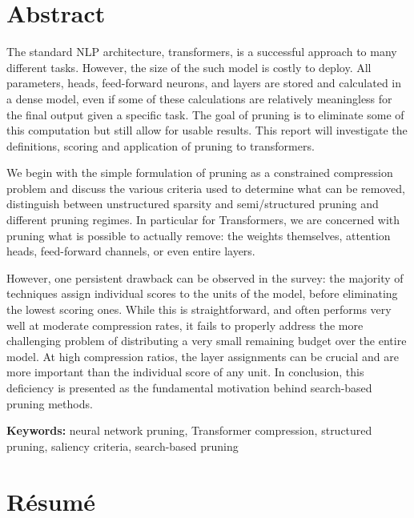 \chapter*{Abstract}

The standard NLP architecture, transformers, is a successful approach to many different tasks. However, the size of the such model is costly to deploy. All parameters, heads, feed-forward neurons, and layers are stored and calculated in a dense model, even if some of these calculations are relatively meaningless for the final output given a specific task. The goal of pruning is to eliminate some of this computation but still allow for usable results. This report will investigate the definitions, scoring and application of pruning to transformers.

We begin with the simple formulation of pruning as a constrained compression problem and discuss the various criteria used to determine what can be removed, distinguish between unstructured sparsity and semi/structured pruning and different pruning regimes. In particular for Transformers, we are concerned with pruning what is possible to actually remove: the weights themselves, attention heads, feed-forward channels, or even entire layers.


However, one persistent drawback can be observed in the survey: the majority of techniques assign individual scores to the units of the model, before eliminating the lowest scoring ones. While this is straightforward, and often performs very well at moderate compression rates, it fails to properly address the more challenging problem of distributing a very small remaining budget over the entire model. At high compression ratios, the layer assignments can be crucial and are more important than the individual score of any unit. In conclusion, this deficiency is presented as the fundamental motivation behind search-based pruning methods.

\vspace{1em}
\noindent\textbf{Keywords:} neural network pruning, Transformer compression, structured pruning, saliency criteria, search-based pruning

\clearpage

\chapter*{R\'esum\'e}

